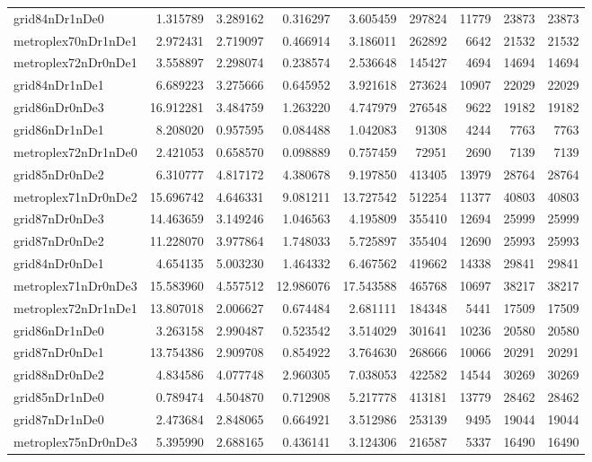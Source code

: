 \begin{longtable}{|l|r|r|r|r|r|r|r|r|}
grid84nDr1nDe0 & 1.315789 & 3.289162 & 0.316297 & 3.605459 & 297824 & 11779 & 23873 & 23873 \\
metroplex70nDr1nDe1 & 2.972431 & 2.719097 & 0.466914 & 3.186011 & 262892 & 6642 & 21532 & 21532 \\
metroplex72nDr0nDe1 & 3.558897 & 2.298074 & 0.238574 & 2.536648 & 145427 & 4694 & 14694 & 14694 \\
grid84nDr1nDe1 & 6.689223 & 3.275666 & 0.645952 & 3.921618 & 273624 & 10907 & 22029 & 22029 \\
grid86nDr0nDe3 & 16.912281 & 3.484759 & 1.263220 & 4.747979 & 276548 & 9622 & 19182 & 19182 \\
grid86nDr1nDe1 & 8.208020 & 0.957595 & 0.084488 & 1.042083 & 91308 & 4244 & 7763 & 7763 \\
metroplex72nDr1nDe0 & 2.421053 & 0.658570 & 0.098889 & 0.757459 & 72951 & 2690 & 7139 & 7139 \\
grid85nDr0nDe2 & 6.310777 & 4.817172 & 4.380678 & 9.197850 & 413405 & 13979 & 28764 & 28764 \\
metroplex71nDr0nDe2 & 15.696742 & 4.646331 & 9.081211 & 13.727542 & 512254 & 11377 & 40803 & 40803 \\
grid87nDr0nDe3 & 14.463659 & 3.149246 & 1.046563 & 4.195809 & 355410 & 12694 & 25999 & 25999 \\
grid87nDr0nDe2 & 11.228070 & 3.977864 & 1.748033 & 5.725897 & 355404 & 12690 & 25993 & 25993 \\
grid84nDr0nDe1 & 4.654135 & 5.003230 & 1.464332 & 6.467562 & 419662 & 14338 & 29841 & 29841 \\
metroplex71nDr0nDe3 & 15.583960 & 4.557512 & 12.986076 & 17.543588 & 465768 & 10697 & 38217 & 38217 \\
metroplex72nDr1nDe1 & 13.807018 & 2.006627 & 0.674484 & 2.681111 & 184348 & 5441 & 17509 & 17509 \\
grid86nDr1nDe0 & 3.263158 & 2.990487 & 0.523542 & 3.514029 & 301641 & 10236 & 20580 & 20580 \\
grid87nDr0nDe1 & 13.754386 & 2.909708 & 0.854922 & 3.764630 & 268666 & 10066 & 20291 & 20291 \\
grid88nDr0nDe2 & 4.834586 & 4.077748 & 2.960305 & 7.038053 & 422582 & 14544 & 30269 & 30269 \\
grid85nDr1nDe0 & 0.789474 & 4.504870 & 0.712908 & 5.217778 & 413181 & 13779 & 28462 & 28462 \\
grid87nDr1nDe0 & 2.473684 & 2.848065 & 0.664921 & 3.512986 & 253139 & 9495 & 19044 & 19044 \\
metroplex75nDr0nDe3 & 5.395990 & 2.688165 & 0.436141 & 3.124306 & 216587 & 5337 & 16490 & 16490 \\

\end{longtable}
